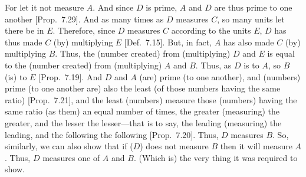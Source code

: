 \begin{Parallel}{}{}
{For let it not measure $A$. And since $D$ is prime, $A$ and $D$ are thus prime to
one another [Prop.~7.29]. 
And as many times as $D$ measures $C$, so many units let there be in $E$.
Therefore, since $D$ measures $C$ according to the units $E$, $D$ has thus
made $C$ (by) multiplying $E$ [Def.~7.15].
But, in fact, $A$ has also made $C$ (by) multiplying $B$. Thus, the
(number created) from (multiplying) $D$ and $E$ is equal to
the (number created) from (multiplying) $A$ and $B$. Thus, as $D$ is to $A$,
so $B$ (is) to $E$ [Prop.~7.19]. And
$D$ and $A$ (are) prime (to one another), and (numbers) prime (to one another
are) also the least (of those numbers having the same ratio) [Prop.~7.21], and the least (numbers) measure
those (numbers) having the same ratio (as them) an equal number of times, the
greater (measuring) the greater, and the lesser the lesser---that is to
say, the leading (measuring) the leading, and the following the following
[Prop.~7.20]. Thus, $D$ measures $B$. So,
 similarly, we can also show that if ($D$) does not measure $B$ then it will measure
 $A$. Thus, $D$ measures one of $A$ and $B$. (Which is) the very thing it was required to show.}
\end{Parallel}

